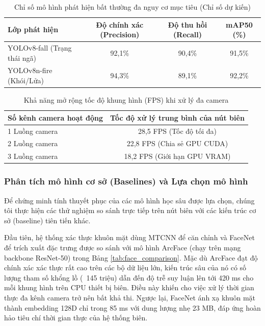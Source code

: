 \documentclass[12pt,a4paper]{article}
\begin{document}
\begin{table}[h]
    \centering
    \caption{Chỉ số mô hình phát hiện bất thường đa nguy cơ mục tiêu (Chỉ số dự kiến)}
    \label{tab:anomaly_bench}
    \begin{tabular}{lccc}
        \toprule
        \textbf{Lớp phát hiện} & \textbf{Độ chính xác (Precision)} & \textbf{Độ thu hồi (Recall)} & \textbf{mAP50 (\%)} \\
        \midrule
        YOLOv8-fall (Trạng thái ngã) & 92,1\% & 90,4\% & 91,5\% \\
        YOLOv8n-fire (Khói/Lửa) & 94,3\% & 89,1\% & 92,2\% \\
        \bottomrule
    \end{tabular}
\end{table}

\begin{table}[h]
    \centering
    \caption{Khả năng mở rộng tốc độ khung hình (FPS) khi xử lý đa camera}
    \label{tab:fps_bench}
    \begin{tabular}{lc}
        \toprule
        \textbf{Số kênh camera hoạt động} & \textbf{Tốc độ xử lý trung bình của nút biên} \\
        \midrule
        1 Luồng camera & 28,5 FPS (Tốc độ tối đa) \\
        2 Luồng camera & 22,8 FPS (Chia sẻ GPU CUDA) \\
        3 Luồng camera & 18,2 FPS (Giới hạn GPU VRAM) \\
        \bottomrule
    \end{tabular}
\end{table}

\subsubsection{Phân tích mô hình cơ sở (Baselines) và Lựa chọn mô hình}
Để chứng minh tính thuyết phục của các mô hình học sâu được lựa chọn, chúng tôi thực hiện các thử nghiệm so sánh trực tiếp trên nút biên với các kiến trúc cơ sở (baseline) tiên tiến khác.

Đầu tiên, hệ thống xác thực khuôn mặt dùng MTCNN để căn chỉnh và FaceNet để trích xuất đặc trưng được so sánh với mô hình ArcFace \cite{arcface_2019} (chạy trên mạng backbone ResNet-50) trong Bảng \ref{tab:face_comparison}.
Mặc dù ArcFace đạt độ chính xác xác thực rất cao trên các bộ dữ liệu lớn, kiến trúc sâu của nó có số lượng tham số khổng lồ (~145 triệu) dẫn đến độ trễ suy luận lên tới 420 ms cho mỗi khung hình trên CPU thiết bị biên. Điều này khiến cho việc xử lý thời gian thực đa kênh camera trở nên bất khả thi. Ngược lại, FaceNet ánh xạ khuôn mặt thành embedding 128D chỉ trong 85 ms với dung lượng nhẹ 23 MB, đáp ứng hoàn hảo tiêu chí thời gian thực của hệ thống biên.
\end{document}
